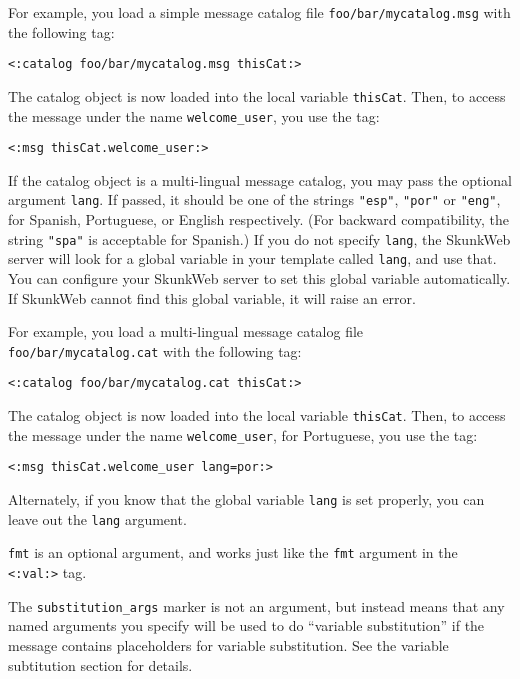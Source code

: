 \documentclass{manual}
\begin{document}
{{For example, you load a simple message catalog file
\texttt{foo/bar/mycatalog.msg} with the following tag:

\begin{verbatim}
<:catalog foo/bar/mycatalog.msg thisCat:>
\end{verbatim}

The catalog object is now loaded into the local variable
\texttt{thisCat}. Then, to access the message under the name
\texttt{welcome_user}, you use the tag:

\begin{verbatim}
<:msg thisCat.welcome_user:>
\end{verbatim}

If the catalog object is a multi-lingual message catalog,
you may pass the optional argument \texttt{lang}. If passed,
it should be one of the strings \texttt{"esp"}, 
\texttt{"por"} or \texttt{"eng"}, for Spanish, Portuguese,
or English respectively. (For backward compatibility, the
string \texttt{"spa"} is acceptable for Spanish.)
If you do not specify \texttt{lang},
the SkunkWeb server will look for a global variable in your template
called \texttt{lang}, and use that.  You can configure your SkunkWeb
server to set this global variable automatically.  If SkunkWeb cannot
find this global variable, it will raise an error.

For example, you load a multi-lingual message catalog file
\texttt{foo/bar/mycatalog.cat} with the following tag:

\begin{verbatim}
<:catalog foo/bar/mycatalog.cat thisCat:>
\end{verbatim}


The catalog object is now loaded into the local variable
\texttt{thisCat}. Then, to access the message under the name
\texttt{welcome_user}, for Portuguese, you use the tag:

\begin{verbatim}
<:msg thisCat.welcome_user lang=por:>
\end{verbatim}

Alternately, if you know that the global variable \texttt{lang}
is set properly, you can leave out the \texttt{lang} argument.

\texttt{fmt} is an optional argument, and works just like 
the \texttt{fmt} argument in the 
\texttt{<:val:>} 
tag.

The \texttt{substitution_args} marker is not an argument, but instead
means that any named arguments you specify will be used to do
``variable substitution'' if the message contains placeholders
for variable substitution. See the 
variable subtitution 
section for details.

}}
\end{document}
